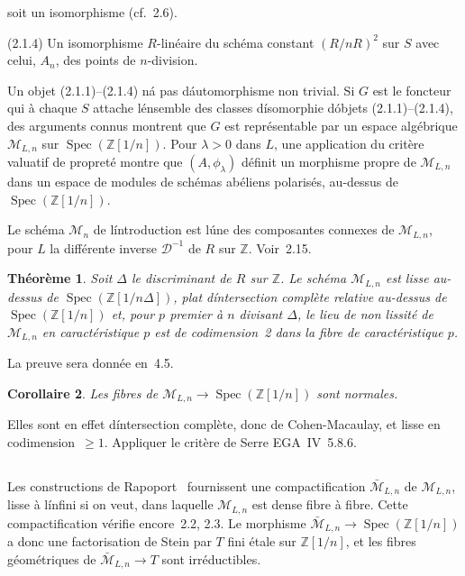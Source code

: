 \documentclass[11pt,a4paper]{article}
\theoremstyle{plain}
\newtheorem{theorem}{Th\'eor\`eme}
\newtheorem{corollary}[theorem]{Corollaire}
\theoremstyle{definition}
\DeclareMathOperator{\Spec}{Spec}
\begin{document}
soit un isomorphisme (cf.~2.6).

(2.1.4) Un isomorphisme $R$-lin\'eaire du sch\'ema constant $(R/nR)^2$ sur $S$ avec
celui, $A_n$, des points de $n$-division.

Un objet (2.1.1)--(2.1.4) n\'a pas d\'automorphisme non trivial. Si $G$ est le
foncteur qui \`a chaque $S$ attache l\'ensemble des classes d\'isomorphie d\'objets
(2.1.1)--(2.1.4), des arguments connus montrent que $G$ est repr\'esentable par un
espace alg\'ebrique $\mathscr{M}_{L,n}$ sur $\Spec(\mathbb{Z}[1/n])$. Pour $\lambda > 0$ dans $L$, une application du
crit\`ere valuatif de propret\'e montre que $(A, \phi_\lambda)$ d\'efinit un morphisme propre de
$\mathscr{M}_{L,n}$ dans un espace de modules de sch\'emas ab\'eliens polaris\'es, au-dessus de
$\Spec(\mathbb{Z}[1/n])$.

Le sch\'ema $\mathscr{M}_n$ de l\'introduction est l\'une des composantes connexes de $\mathscr{M}_{L,n}$,
pour $L$ la diff\'erente inverse $\mathscr{D}^{-1}$ de $R$ sur $\mathbb{Z}$. Voir~2.15.

\begin{theorem}
Soit $\Delta$ le discriminant de $R$ sur $\mathbb{Z}$. Le sch\'ema $\mathscr{M}_{L,n}$ est lisse
au-dessus de $\Spec(\mathbb{Z}[1/n\Delta])$, plat d\'intersection compl\`ete relative au-dessus de
$\Spec(\mathbb{Z}[1/n])$ et, pour $p$ premier \`a $n$ divisant $\Delta$, le lieu de non lissit\'e de $\mathscr{M}_{L,n}$ en
caract\'eristique $p$ est de codimension~2 dans la fibre de caract\'eristique $p$.
\end{theorem}

La preuve sera donn\'ee en~4.5.

\begin{corollary}
Les fibres de $\mathscr{M}_{L,n} \to \Spec(\mathbb{Z}[1/n])$ sont normales.
\end{corollary}

Elles sont en effet d\'intersection compl\`ete, donc de Cohen-Macaulay, et lisse
en codimension~$\geq 1$. Appliquer le crit\`ere de Serre EGA~IV~5.8.6.

\subsection{}

Les constructions de Rapoport~\cite{Rapoport} fournissent une compactification $\bar{\mathscr{M}}_{L,n}$
de $\mathscr{M}_{L,n}$, lisse \`a l\'infini si on veut, dans laquelle $\mathscr{M}_{L,n}$ est dense fibre \`a fibre. Cette
compactification v\'erifie encore~2.2, 2.3. Le morphisme $\bar{\mathscr{M}}_{L,n} \to \Spec(\mathbb{Z}[1/n])$ a
donc une factorisation de Stein par $T$ fini \'etale sur $\mathbb{Z}[1/n]$, et les fibres
g\'eom\'etriques de $\bar{\mathscr{M}}_{L,n} \to T$ sont irr\'eductibles.
\end{document}

